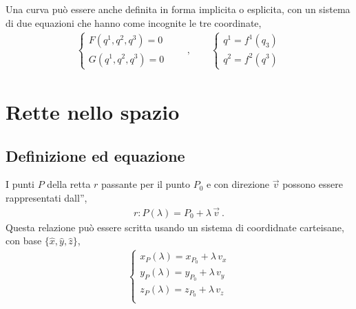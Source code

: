 \documentclass[letterpaper,10pt,italian]{jupyterBook}
\begin{document}
\sphinxAtStartPar
Una curva può essere anche definita in forma implicita o esplicita, con un sistema di due equazioni che hanno come incognite le tre coordinate,
\begin{equation*}
\begin{split}
\begin{cases} F(q^1, q^2, q^3) = 0 \\ G(q^1, q^2, q^3) = 0 \end{cases} \qquad, \qquad
\begin{cases} q^1 = f^1(q_3) \\ q^2 = f^2(q^3) \end{cases}
\end{split}
\end{equation*}
\sphinxstepscope


\section{Rette nello spazio}
\label{\detokenize{ch/analytic_geometry/analytic_geometry_3d/lines:rette-nello-spazio}}\label{\detokenize{ch/analytic_geometry/analytic_geometry_3d/lines:geometry-analytic-3d-lines}}\label{\detokenize{ch/analytic_geometry/analytic_geometry_3d/lines::doc}}

\subsection{Definizione ed equazione}
\label{\detokenize{ch/analytic_geometry/analytic_geometry_3d/lines:definizione-ed-equazione}}
\sphinxAtStartPar
{} I punti \(P\) della retta \(r\) passante per il punto \(P_0\) e con direzione \(\vec{v}\) possono essere rappresentati dall”,
\begin{equation}\label{equation:ch/analytic_geometry/analytic_geometry_3d/lines:eq:analytic-geo:3d:lines:param}
\begin{split}r: P(\lambda) = P_0 + \lambda \, \vec{v} \ .\end{split}
\end{equation}
\sphinxAtStartPar
Questa relazione può essere scritta usando un sistema di coordidnate carteisane, con base \(\{ \hat{x}, \hat{y}, \hat{z} \}\),
\begin{equation*}
\begin{split}\begin{cases}
x_P(\lambda) = x_{P_0} + \lambda \, v_x \\
y_P(\lambda) = y_{P_0} + \lambda \, v_y \\
z_P(\lambda) = z_{P_0} + \lambda \, v_z \\
\end{cases}\end{split}
\end{equation*}
\sphinxAtStartPar
{} 
\end{document}
